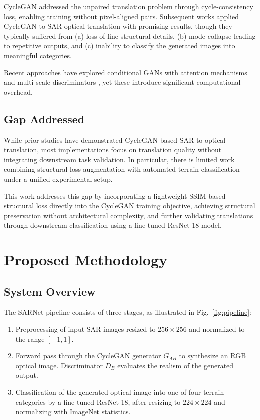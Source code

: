 \documentclass[conference]{IEEEtran}
\begin{document}
CycleGAN \cite{zhu2017} addressed the unpaired translation problem through cycle-consistency loss, enabling training without pixel-aligned pairs. Subsequent works applied CycleGAN to SAR-optical translation \cite{fuentes2019, li2021sar} with promising results, though they typically suffered from (a) loss of fine structural details, (b) mode collapse leading to repetitive outputs, and (c) inability to classify the generated images into meaningful categories.

Recent approaches have explored conditional GANs with attention mechanisms \cite{zhang2019self} and multi-scale discriminators \cite{wang2018pix2pixhd}, yet these introduce significant computational overhead.

\subsection{Gap Addressed}

While prior studies have demonstrated CycleGAN-based SAR-to-optical translation, most implementations focus on translation quality without integrating downstream task validation. In particular, there is limited work combining structural loss augmentation with automated terrain classification under a unified experimental setup.

This work addresses this gap by incorporating a lightweight SSIM-based structural loss directly into the CycleGAN training objective, achieving structural preservation without architectural complexity, and further validating translations through downstream classification using a fine-tuned ResNet-18 model.

\section{Proposed Methodology}

\subsection{System Overview}

The SARNet pipeline consists of three stages, as illustrated in Fig.~\ref{fig:pipeline}:
\begin{enumerate}
    \item Preprocessing of input SAR images resized to $256 \times 256$ and normalized to the range $[-1, 1]$.
    \item Forward pass through the CycleGAN generator $G_{AB}$ to synthesize an RGB optical image. Discriminator $D_B$ evaluates the realism of the generated output.
    \item Classification of the generated optical image into one of four terrain categories by a fine-tuned ResNet-18, after resizing to $224 \times 224$ and normalizing with ImageNet statistics.
\end{enumerate}
\end{document}
